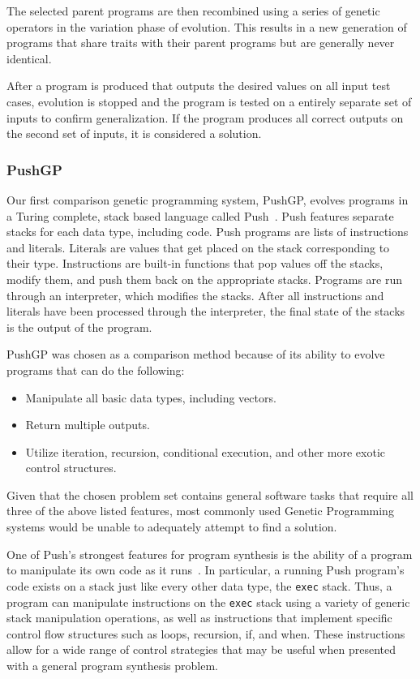 The selected parent programs are then recombined using a series of genetic operators in the variation phase of evolution. This results in a new generation of programs that share traits with their parent programs but are generally never identical.

After a program is produced that outputs the desired values on all input test cases, evolution is stopped and the program is tested on a entirely separate set of inputs to confirm generalization. If the program produces all correct outputs on the second set of inputs, it is considered a solution.

\subsubsection{PushGP}

Our first comparison genetic programming system, PushGP, evolves programs in a Turing complete, stack based language called Push~\cite{Spector2002, Spector2005}. Push features separate stacks for each data type, including code. Push programs are lists of instructions and literals. Literals are values that get placed on the stack corresponding to their type. Instructions are built-in functions that pop values off the stacks, modify them, and push them back on the appropriate stacks. Programs are run through an interpreter, which modifies the stacks. After all instructions and literals have been processed through the interpreter, the final state of the stacks is the output of the program.

PushGP was chosen as a comparison method because of its ability to evolve programs that can do the following:
\begin{itemize}
\item Manipulate all basic data types, including vectors.
\item Return multiple outputs.
\item Utilize iteration, recursion, conditional execution, and other more exotic control structures.
\end{itemize}
Given that the chosen problem set contains general software tasks that require all three of the above listed features, most commonly used Genetic Programming systems would be unable to adequately attempt to find a solution.

One of Push's strongest features for program synthesis is the ability of a program to manipulate its own code as it runs~\cite{Spector2005}. In particular, a running Push program's code exists on a stack just like every other data type, the \texttt{exec} stack. Thus, a program can manipulate instructions on the \texttt{exec} stack using a variety of generic stack manipulation operations, as well as instructions that implement specific control flow structures such as loops, recursion, if, and when. These instructions allow for a wide range of control strategies that may be useful when presented with a general program synthesis problem.

